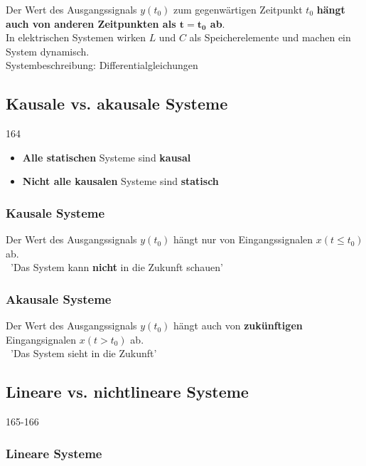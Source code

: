 Der Wert des Ausgangssignals $y(t_0)$ zum gegenwärtigen Zeitpunkt $t_0$ \textbf{hängt auch von anderen Zeitpunkten als $\bm{t = t_0}$ ab}. \\
In elektrischen Systemen wirken $L$ und $C$ als Speicherelemente und machen ein System dynamisch. \\
Systembeschreibung: Differentialgleichungen


\subsection{Kausale vs. akausale Systeme}{164}

\begin{itemize}
    \item \textbf{Alle statischen} Systeme sind \textbf{kausal} 
    \item \textbf{Nicht alle kausalen} Systeme sind \textbf{statisch}
\end{itemize}



\subsubsection{Kausale Systeme}

Der Wert des Ausgangssignals $y(t_0)$ hängt nur von Eingangssignalen $x(t \leq t_0)$ ab. \\
\textrightarrow\ 'Das System kann \textbf{nicht} in die Zukunft schauen' \\
\vspace{0.1cm}


\subsubsection{Akausale Systeme}

Der Wert des Ausgangssignals $y(t_0)$ hängt auch von \textbf{zukünftigen} Eingangsignalen $x(t > t_0)$ ab. \\
\textrightarrow\ 'Das System sieht in die Zukunft' 


\subsection{Lineare vs. nichtlineare Systeme}{165-166}

\subsubsection{Lineare Systeme}

